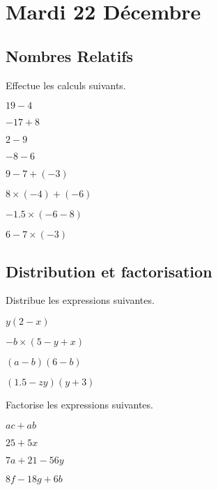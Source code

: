 \section{Mardi 22 Décembre}

\subsection{Nombres Relatifs}

\begin{exercicefr}
    Effectue les calculs suivants.
    \begin{exerciceenum}
        \item $19 - 4$
        \item $-17 + 8$
        \item $2 - 9$
        \item $- 8 - 6$
        \item $9 - 7 + (-3)$
        \item $8 \times (-4) + (-6)$
        \item $-1.5 \times (-6 - 8)$
        \item $6 - 7 \times (-3)$
    \end{exerciceenum}
\end{exercicefr}

\subsection{Distribution et factorisation}

\begin{exercicefr}
    Distribue les expressions suivantes.
    \begin{exerciceenum}
        \item $y(2 - x)$
        \item $-b\times (5 - y + x)$
        \item $(a - b)(6 - b)$
        \item $(1.5 - zy)(y + 3)$
    \end{exerciceenum}
\end{exercicefr}

\begin{exercicefr}
    Factorise les expressions suivantes.
    \begin{exerciceenum}
        \item $ac + ab$
        \item $25 + 5x$
        \item $7a + 21 - 56y$
        \item $8f - 18g + 6b$
    \end{exerciceenum}
\end{exercicefr}

